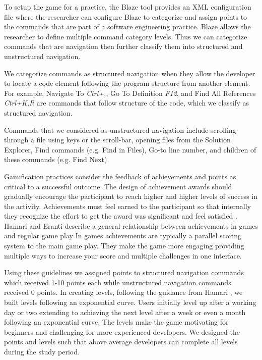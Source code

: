 \documentclass{sig-alternate}
\begin{document}
To setup the game for a practice, the Blaze tool provides an XML configuration file where the researcher can configure Blaze to categorize and assign points to the commands that are part of a software engineering practice.  Blaze allows the researcher to define multiple command category levels.  Thus we can categorize commands that are navigation then further classify them into structured and unstructured navigation.  

We categorize commands as structured navigation when they allow the developer to locate a code element following the program structure from another element.  For example, Navigate To \textit{Ctrl+,}, Go To Definition \textit{F12}, and Find All References \textit{Ctrl+K,R} are commands that follow structure of the code, which we classify as structured navigation.

Commands that we considered as unstructured navigation include scrolling through a file using keys or the scroll-bar, opening files from the Solution Explorer, Find commands (e.g. Find in Files), Go-to line number, and children of these commands (e.g. Find Next).

Gamification practices consider the feedback of achievements and points as critical to a successful outcome.  The design of achievement awards should gradually encourage the participant to reach higher and higher levels of success in the activity.  Achievements must feel earned to the participant so that internally they recognize the effort to get the award was significant and feel satisfied  \cite{wbsnipes:Hamari2011Framework}.  Hamari and Eranti describe a general relationship between achievements in games and regular game play      In games achievements are typically a parallel scoring system to the main game play.  They make the game more engaging providing multiple ways to increase your score and multiple challenges in one interface.

Using these guidelines we assigned points to structured navigation commands which received 1-10 points each while unstructured navigation commands received 0 points.    In creating levels, following the guidance from Hamari \cite{wbsnipes:Hamari2011Framework}, we built levels following an exponential curve.  Users initially level up after a working day or two extending to achieving the next level after a week or even a month following an exponential curve.  The levels make the game motivating for beginners and challenging for more experienced developers.  We designed the points and levels such that above average developers can complete all levels during the study period.
\end{document}
